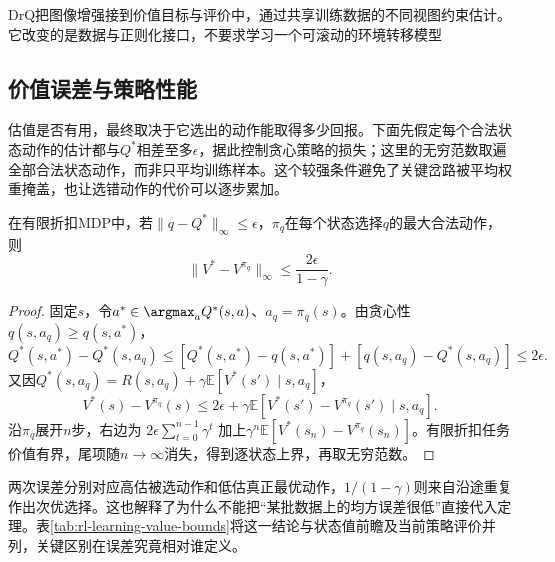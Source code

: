 DrQ把图像增强接到价值目标与评价中，通过共享训练数据的不同视图约束估计。它改变的是数据与正则化接口，不要求学习一个可滚动的环境转移模型

\subsection{价值误差与策略性能}
\label{sec:rl-learning-value-performance}

估值是否有用，最终取决于它选出的动作能取得多少回报。下面先假定每个合法状态动作的估计都与$Q^*$相差至多$\epsilon$，据此控制贪心策略的损失；这里的无穷范数取遍全部合法状态动作，而非只平均训练样本。这个较强条件避免了关键岔路被平均权重掩盖，也让选错动作的代价可以逐步累加。

\begin{theorem}[动作价值误差到贪心策略损失]
  \label{thm:rl-learning-q-performance}
  在有限折扣MDP中，若$\lVert q-Q^*\rVert_\infty\leq\epsilon$，$\pi_q$在每个状态选择$q$的最大合法动作，则
  \begin{equation}
    \lVert V^*-V^{\pi_q}\rVert_\infty
       \leq\frac{2\epsilon}{1-\gamma}.
    \label{eq:rl-learning-q-performance}
  \end{equation}
\end{theorem}
\begin{proof}
  固定$s$，令$a^*\in\argmax_aQ^*(s,a)$、$a_q=\pi_q(s)$。由贪心性$q(s,a_q)\geq q(s,a^*)$，
  \[
    Q^*(s,a^*)-Q^*(s,a_q)
      \leq[Q^*(s,a^*)-q(s,a^*)]
            +[q(s,a_q)-Q^*(s,a_q)]\leq2\epsilon.
  \]
  又因$Q^*(s,a_q)=R(s,a_q)+\gamma\mathbb E[V^*(s')\mid s,a_q]$，
  \[
    V^*(s)-V^{\pi_q}(s)
      \leq2\epsilon+\gamma
          \mathbb E[V^*(s')-V^{\pi_q}(s')\mid s,a_q].
  \]
  沿$\pi_q$展开$n$步，右边为
  $2\epsilon\sum_{t=0}^{n-1}\gamma^t$
  加上$\gamma^n\mathbb E[V^*(s_n)-V^{\pi_q}(s_n)]$。有限折扣任务价值有界，尾项随$n\to\infty$消失，得到逐状态上界，再取无穷范数。
\end{proof}

两次误差分别对应高估被选动作和低估真正最优动作，$1/(1-\gamma)$则来自沿途重复作出次优选择。这也解释了为什么不能把“某批数据上的均方误差很低”直接代入定理。表\ref{tab:rl-learning-value-bounds}将这一结论与状态值前瞻及当前策略评价并列，关键区别在误差究竟相对谁定义。

